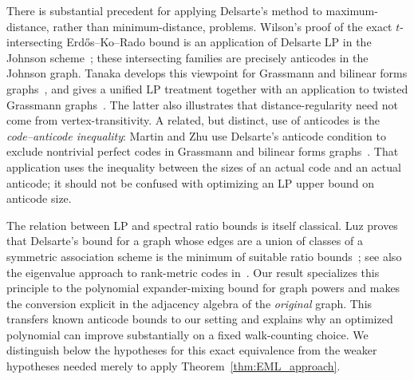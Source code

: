 \documentclass[11pt]{article}
\theoremstyle{plain}
\numberwithin{equation}{section}
\begin{document}
There is substantial precedent for applying Delsarte's method to maximum-distance, rather than minimum-distance, problems. Wilson's proof of the exact $t$-intersecting Erd\H{o}s--Ko--Rado bound is an application of Delsarte LP in the Johnson scheme~\cite{Wilson_1984}; these intersecting families are precisely anticodes in the Johnson graph. Tanaka develops this viewpoint for Grassmann and bilinear forms graphs~\cite{Tanaka_2006}, and gives a unified LP treatment together with an application to twisted Grassmann graphs~\cite{Tanaka_2012}. The latter also illustrates that distance-regularity need not come from vertex-transitivity. A related, but distinct, use of anticodes is the \emph{code--anticode inequality}: Martin and Zhu use Delsarte's anticode condition to exclude nontrivial perfect codes in Grassmann and bilinear forms graphs~\cite{Martin_Zhu_1995}. That application uses the inequality between the sizes of an actual code and an actual anticode; it should not be confused with optimizing an LP upper bound on anticode size.

The relation between LP and spectral ratio bounds is itself classical. Luz proves that Delsarte's bound for a graph whose edges are a union of classes of a symmetric association scheme is the minimum of suitable ratio bounds~\cite{Luz_2007}; see also the eigenvalue approach to rank-metric codes in~\cite{Abiad2024EigenvalueCodes}. Our result specializes this principle to the polynomial expander-mixing bound for graph powers and makes the conversion explicit in the adjacency algebra of the \emph{original} graph. This transfers known anticode bounds to our setting and explains why an optimized polynomial can improve substantially on a fixed walk-counting choice. We distinguish below the hypotheses for this exact equivalence from the weaker hypotheses needed merely to apply Theorem~\ref{thm:EML_approach}.


\end{document}
